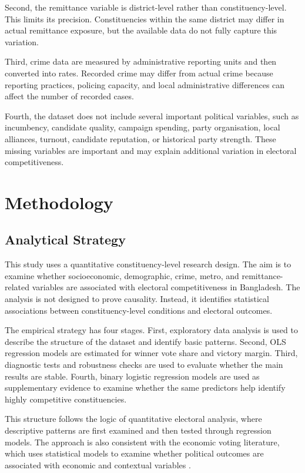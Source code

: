 \documentclass[12pt,a4paper]{article}
\begin{document}
Second, the remittance variable is district-level rather than constituency-level. This limits its precision. Constituencies within the same district may differ in actual remittance exposure, but the available data do not fully capture this variation.

Third, crime data are measured by administrative reporting units and then converted into rates. Recorded crime may differ from actual crime because reporting practices, policing capacity, and local administrative differences can affect the number of recorded cases.

Fourth, the dataset does not include several important political variables, such as incumbency, candidate quality, campaign spending, party organisation, local alliances, turnout, candidate reputation, or historical party strength. These missing variables are important and may explain additional variation in electoral competitiveness.

\section{Methodology}

\subsection{Analytical Strategy}

This study uses a quantitative constituency-level research design. The aim is to examine whether socioeconomic, demographic, crime, metro, and remittance-related variables are associated with electoral competitiveness in Bangladesh. The analysis is not designed to prove causality. Instead, it identifies statistical associations between constituency-level conditions and electoral outcomes.

The empirical strategy has four stages. First, exploratory data analysis is used to describe the structure of the dataset and identify basic patterns. Second, OLS regression models are estimated for winner vote share and victory margin. Third, diagnostic tests and robustness checks are used to evaluate whether the main results are stable. Fourth, binary logistic regression models are used as supplementary evidence to examine whether the same predictors help identify highly competitive constituencies.

This structure follows the logic of quantitative electoral analysis, where descriptive patterns are first examined and then tested through regression models. The approach is also consistent with the economic voting literature, which uses statistical models to examine whether political outcomes are associated with economic and contextual variables \citep{oganesyan2014}.
\end{document}
